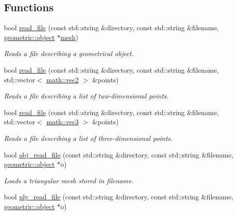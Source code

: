 \subsection*{Functions}
\begin{DoxyCompactItemize}
\item 
bool \hyperlink{namespacephysim_1_1input_a7f2e283bc4dea0626ffcdb51ba9eaf35}{read\+\_\+file} (const std\+::string \&directory, const std\+::string \&filename, \hyperlink{classphysim_1_1geometric_1_1object}{geometric\+::object} $\ast$\hyperlink{classphysim_1_1meshes_1_1mesh}{mesh})
\begin{DoxyCompactList}\small\item\em Reads a file describing a geometrical object. \end{DoxyCompactList}\item 
bool \hyperlink{namespacephysim_1_1input_acdb309721dbf67221cb844cb5b73d2bc}{read\+\_\+file} (const std\+::string \&directory, const std\+::string \&filename, std\+::vector$<$ \hyperlink{structphysim_1_1math_1_1vec2}{math\+::vec2} $>$ \&points)
\begin{DoxyCompactList}\small\item\em Reads a file describing a list of two-\/dimensional points. \end{DoxyCompactList}\item 
bool \hyperlink{namespacephysim_1_1input_af6b64d6efb944ca27335ac40671144b9}{read\+\_\+file} (const std\+::string \&directory, const std\+::string \&filename, std\+::vector$<$ \hyperlink{structphysim_1_1math_1_1vec3}{math\+::vec3} $>$ \&points)
\begin{DoxyCompactList}\small\item\em Reads a file describing a list of three-\/dimensional points. \end{DoxyCompactList}\item 
bool \hyperlink{namespacephysim_1_1input_ab6a152c0cdac6c0041f0c3402ffc568e}{obj\+\_\+read\+\_\+file} (const std\+::string \&directory, const std\+::string \&filename, \hyperlink{classphysim_1_1geometric_1_1object}{geometric\+::object} $\ast$o)
\begin{DoxyCompactList}\small\item\em Loads a triangular mesh stored in {\itshape filename}. \end{DoxyCompactList}\item 
bool \hyperlink{namespacephysim_1_1input_a275d779352762c55a24c0e6b8e9dcc26}{ply\+\_\+read\+\_\+file} (const std\+::string \&directory, const std\+::string \&filename, \hyperlink{classphysim_1_1geometric_1_1object}{geometric\+::object} $\ast$o)

\end{DoxyCompactItemize}
